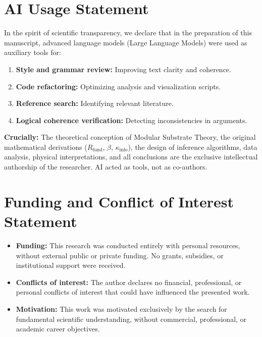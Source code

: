 \documentclass[11pt, a4paper]{article}
\theoremstyle{plain}
\theoremstyle{definition}
\newcommand{\Rfactor}{R_{\text{fund}}}
\newcommand{\Kinfo}{\kappa_{\text{info}}}
\begin{document}
\section*{AI Usage Statement}

In the spirit of scientific transparency, we declare that in the preparation of this manuscript, advanced language models (Large Language Models) were used as auxiliary tools for:

\begin{enumerate}
    \item \textbf{Style and grammar review:} Improving text clarity and coherence.
    \item \textbf{Code refactoring:} Optimizing analysis and visualization scripts.
    \item \textbf{Reference search:} Identifying relevant literature.
    \item \textbf{Logical coherence verification:} Detecting inconsistencies in arguments.
\end{enumerate}

\textbf{Crucially:} The theoretical conception of Modular Substrate Theory, the original mathematical derivations ($\Rfactor$, $\beta$, $\Kinfo$), the design of inference algorithms, data analysis, physical interpretations, and all conclusions are the exclusive intellectual authorship of the researcher. AI acted as tools, not as co-authors.

\section*{Funding and Conflict of Interest Statement}

\begin{itemize}
    \item \textbf{Funding:} This research was conducted entirely with personal resources, without external public or private funding. No grants, subsidies, or institutional support were received.
    
    \item \textbf{Conflicts of interest:} The author declares no financial, professional, or personal conflicts of interest that could have influenced the presented work.
    
    \item \textbf{Motivation:} This work was motivated exclusively by the search for fundamental scientific understanding, without commercial, professional, or academic career objectives.
\end{itemize}
\end{document}
